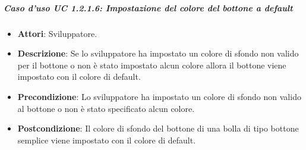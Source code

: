 \subparagraph{Caso d'uso UC 1.2.1.6: Impostazione del colore del bottone a default}

\FloatBarrier
\begin{itemize}
\item\textbf{Attori}: Sviluppatore.
\item\textbf{Descrizione}: Se lo sviluppatore ha impostato un colore di sfondo non valido per il bottone o non è stato impostato alcun colore allora il bottone viene impostato con il colore di default.
\item\textbf{Precondizione}: Lo sviluppatore ha impostato un colore di sfondo non valido al bottone o non è stato specificato alcun colore.
\item\textbf{Postcondizione}: Il colore di sfondo del bottone di una bolla di tipo bottone semplice viene impostato con il colore di default.
\end{itemize}
